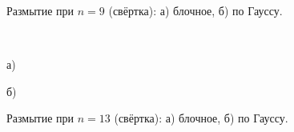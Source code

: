 \documentclass[a5paper, 10pt]{article}
\theoremstyle{definition}
\theoremstyle{plain}
\theoremstyle{remark}
\begin{document}
\begin{figure}[h!]
\begin{minipage}[h!]{0.47\linewidth}
\end{minipage}
\caption{Размытие при $n= 9$ (свёртка): а) блочное, б) по Гауссу.}
\,
\vfill
\begin{minipage}[h!]{0.47\linewidth}
 а) \\
\end{minipage}
\hfill
\begin{minipage}[h!]{0.47\linewidth}
 б) \\
\end{minipage}
\caption{Размытие при $n= 13$ (свёртка): а) блочное, б) по Гауссу.}
\end{figure}
\end{document}
